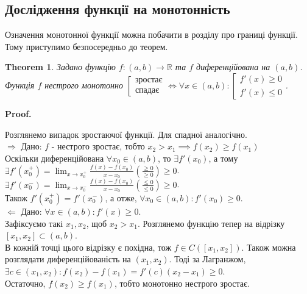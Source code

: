\documentclass[a4paper, 14pt]{article}
\makeatletter
\def\huge{\displaystyle}
\def\qed{$\blacksquare$}
\def\rightproof{$\boxed{\Rightarrow}$ }
\def\leftproof{$\boxed{\Leftarrow}$ }
\theoremstyle{theoremdd}
\newtheorem{theorem}{Theorem}[subsection]
\theoremstyle{theoremdd}
\theoremstyle{theoremdd}
\theoremstyle{theoremdd}
\theoremstyle{theoremdd}
\theoremstyle{theoremdd}
\theoremstyle{theoremdd}
\theoremstyle{theoremdd}
\renewenvironment{proof}[1][Proof.\\]{\par
\pushQED{\hfill \qed}%
\normalfont \topsep6\p@\@plus6\p@\relax
\trivlist
\item\relax
{\bfseries
#1\@addpunct{.}}\hspace\labelsep\ignorespaces
}{%
\popQED\endtrivlist\@endpefalse
}
\makeatother
\begin{document}
\subsection{Дослідження функції на монотонність}
Означення монотонної функції можна побачити в розділу про границі функції. Тому приступимо безпосередньо до теорем.
\begin{theorem}
Задано функцію $f: (a,b) \to \mathbb{R}$ та $f$ диференційована на $(a,b)$.\\
Функція $f$ нестрого монотонно $\left[ \begin{gathered} \textrm{зростає} \\ \textrm{спадає} \end{gathered} \right. \iff \forall x \in (a,b): \left[ \begin{gathered} f'(x) \geq 0 \\ f'(x) \leq 0 \end{gathered} \right.$.
\end{theorem}

\begin{proof}
Розглянемо випадок зростаючої функції. Для спадної аналогічно.\\
\rightproof Дано: $f$ - нестрого зростає, тобто $x_2 > x_1 \implies f(x_2) \geq f(x_1)$\\
Оскільки диференційована $\forall x_0 \in (a,b)$, то $\exists f'(x_0)$, а тому \\ 
$\exists f'(x_0^+) = \huge \lim_{x \to x_0^+} \frac{f(x)-f(x_0)}{x-x_0} \left( \frac{\geq 0}{\geq 0} \right) \geq 0$.\\
$\exists f'(x_0^-) = \huge \lim_{x \to x_0^-} \frac{f(x)-f(x_0)}{x-x_0} \left( \frac{\leq 0}{\leq 0} \right) \geq 0$.\\
Також $f'(x_0^+) = f'(x_0^-)$, а отже, $\forall x_0 \in (a,b): f'(x_0) \geq 0$.
\bigskip \\
\leftproof Дано: $\forall x \in (a,b): f'(x) \geq 0$.\\
Зафіксуємо такі $x_1,x_2$, щоб $x_2 > x_1$. Розглянемо функцію тепер на відрізку $[x_1,x_2] \subset (a,b)$.\\
В кожній точці цього відрізку є похідна, тож $f \in C([x_1,x_2])$. Також можна розглядати диференційованість на $(x_1,x_2)$. Тоді за Лагранжом,\\
$\exists c \in (x_1,x_2): f(x_2)-f(x_1) = f'(c)(x_2-x_1) \geq 0$.\\
Остаточно, $f(x_2) \geq f(x_1)$, тобто монотонно нестрого зростає.
\end{proof}
\end{document}
